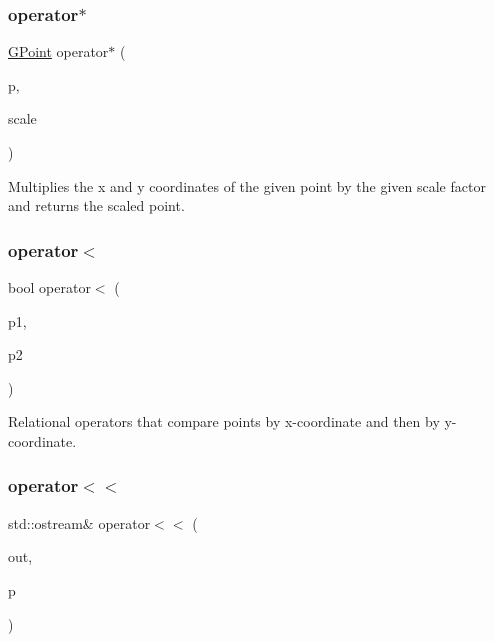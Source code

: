 \subsubsection{\texorpdfstring{operator$\ast$}{operator*}}
{\footnotesize\ttfamily \mbox{\hyperlink{classGPoint}{G\+Point}} operator$\ast$ (\begin{DoxyParamCaption}\item[{const \mbox{\hyperlink{classGPoint}{G\+Point}} \&}]{p,  }\item[{double}]{scale }\end{DoxyParamCaption})\hspace{0.3cm}{\ttfamily [friend]}}



Multiplies the x and y coordinates of the given point by the given scale factor and returns the scaled point. 

\mbox{\label{classGPoint_a8ef7ca0053558918c5f7bcae257c1bec}} 
\subsubsection{\texorpdfstring{operator$<$}{operator<}}
{\footnotesize\ttfamily bool operator$<$ (\begin{DoxyParamCaption}\item[{const \mbox{\hyperlink{classGPoint}{G\+Point}} \&}]{p1,  }\item[{const \mbox{\hyperlink{classGPoint}{G\+Point}} \&}]{p2 }\end{DoxyParamCaption})\hspace{0.3cm}{\ttfamily [friend]}}



Relational operators that compare points by x-\/coordinate and then by y-\/coordinate. 

\mbox{\label{classGPoint_aa8890c3cbec1c39bac51117875950b01}} 
\subsubsection{\texorpdfstring{operator$<$$<$}{operator<<}}
{\footnotesize\ttfamily std\+::ostream\& operator$<$$<$ (\begin{DoxyParamCaption}\item[{std\+::ostream \&}]{out,  }\item[{const \mbox{\hyperlink{classGPoint}{G\+Point}} \&}]{p }\end{DoxyParamCaption})\hspace{0.3cm}{\ttfamily [friend]}}




